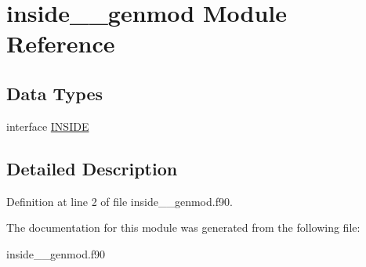 \hypertarget{classinside____genmod}{\section{inside\+\_\+\+\_\+genmod Module Reference}
\label{classinside____genmod}
}
\subsection*{Data Types}
\begin{DoxyCompactItemize}
\item 
interface \hyperlink{interfaceinside____genmod_1_1_i_n_s_i_d_e}{I\+N\+S\+I\+D\+E}
\end{DoxyCompactItemize}


\subsection{Detailed Description}


Definition at line 2 of file inside\+\_\+\+\_\+genmod.\+f90.



The documentation for this module was generated from the following file\+:\begin{DoxyCompactItemize}
\item 
inside\+\_\+\+\_\+genmod.\+f90\end{DoxyCompactItemize}
